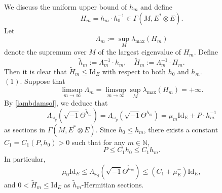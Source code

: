 \documentclass[12pt, reqno]{amsart}
\theoremstyle{plain}
\theoremstyle{definition}
\newcommand{\sq}{\sqrt{-1}}
\newcommand{\beq}{\begin{equation}}
\newcommand{\eeq}{\end{equation}}
\renewcommand{\tilde}{\widetilde}
\newcommand{\ts}{\otimes}
\renewcommand{\>}{\rightarrow}
\renewcommand{\>}{\rightarrow}
\renewcommand{\tilde}{\widetilde}
\numberwithin{equation}{section} %
\begin{document}
We discuss the uniform upper bound of $h_m$ and define \beq
H_m=h_m\cdot h_0^{-1}\in\Gamma(M,E^*\ts E). \eeq Let  \beq \Lambda_m
:= \sup_M \lambda_{\max}(H_m)\eeq denote the supremum over $M$ of
the largest eigenvalue of $H_m$.  Define \beq \tilde h_m:=
\Lambda_m^{-1}\cdot h_m, \quad \tilde H_m:=\Lambda_m^{-1}\cdot H_m.
\eeq
Then it is clear that $ \tilde H_m\leq \mathrm{Id}_E$ with respect  to both $h_0$ and $h_m$.\\


$(1)$. Suppose that \beq \limsup_{m\>\infty}\Lambda_m = \limsup_{m\>\infty}\sup_M \lambda_{\max}(H_m)=+\infty.\eeq
By \eqref{lambdamsol}, we  deduce that \beq
\label{lambdasoltildeh}\Lambda_{\omega_g}\left(\sq \Theta^{\tilde
	h_m}\right) =\Lambda_{\omega_g}\left(\sq \Theta^{h_m}\right) = \mu_m
\mathrm{Id}_E+P \cdot h_m^{-1} \eeq as sections in $
\Gamma(M,E^*\otimes E) $. Since $h_0\leq h_m$, there exists a
constant $ C_1 = C_1(P, h_0) > 0 $ such that for any $ m \in
\mathbb{N} $, \beq P\leq C_1 h_0\leq C_1 h_m.\eeq In particular,
\beq \mu_0 \mathrm{Id}_E \leq \Lambda_{\omega_g}\left(\sq
\Theta^{\tilde h_m}\right)  \leq
\left(C_1+\mu_E^-\right)\mathrm{Id}_E, \label{boundedcurvature} \eeq
and $0<\tilde H_m\leq \mathrm{Id}_E$
as $ \tilde h_m $-Hermitian sections.
\end{document}
